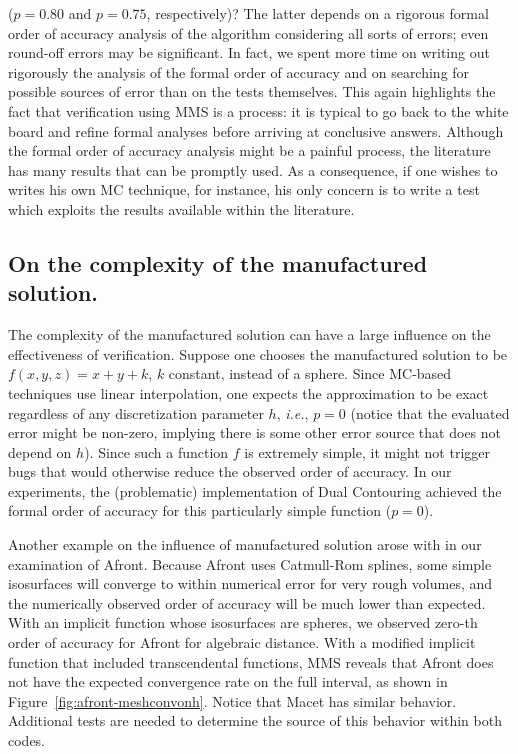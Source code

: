 ($p = 0.80$ and $p = 0.75$, respectively)?
%
The latter depends on a rigorous formal order of accuracy analysis of the algorithm
considering all sorts of errors; even round-off errors may be
significant. In fact, we spent more time on writing out rigorously the
analysis of the formal order of accuracy and on searching for possible sources of
error than on the tests themselves. This again highlights the fact that verification 
using MMS is a process: it is typical to go back to the white board and refine
formal analyses before arriving at conclusive answers.
%
Although the formal order of accuracy analysis might be a painful
process, the literature has many results that can be promptly
used. As a consequence, if one wishes to writes his own MC technique,
for instance, his only concern is to write a test which exploits 
the results available within the literature.

\subsection{On the complexity of the manufactured solution.}
\label{chap1:sec:mms-complexity}
The complexity of the manufactured solution can have a large influence
on the effectiveness of verification. 
Suppose one chooses the manufactured solution to be $f(x,y,z) = x + y + k
$, $k$ constant, instead of a
sphere. Since MC-based techniques use linear interpolation,
one expects the approximation
to be exact regardless of any discretization
parameter $h$, {\em i.e.}, $p = 0$ (notice that the evaluated error might
be non-zero, implying there is some other error source that
does not depend on $h$).
%
Since such a function $f$ is extremely simple,
it might not trigger bugs that would otherwise reduce the
observed order of accuracy. In our experiments, the (problematic) implementation of
Dual Contouring achieved the formal order of accuracy for this
particularly simple function ($p = 0$).

Another example on the influence of manufactured solution arose with
in our examination of Afront. Because Afront uses Catmull-Rom splines, some simple
isosurfaces will converge to within numerical error for very rough
volumes, and the numerically observed order of accuracy will be much
lower than expected. With an implicit function whose isosurfaces are
spheres, we observed zero-th order of accuracy for Afront for algebraic distance. 
With a modified implicit function that included transcendental functions, 
MMS reveals that Afront does not have the expected convergence rate on the 
full interval, as shown in
Figure~\ref{fig:afront-meshconvonh}. Notice that Macet has similar behavior.
Additional tests are needed to determine the source 
of this behavior within both codes.

